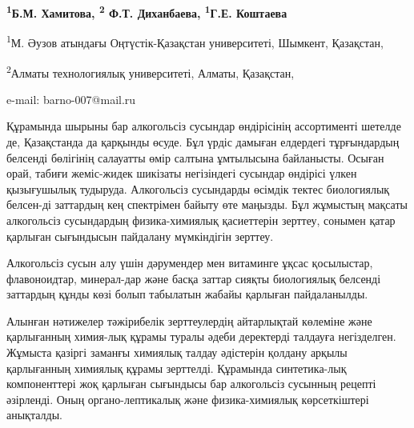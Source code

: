 \begin{center}

{\bfseries \textsuperscript{1}Б.М. Хамитова\envelope, \textsuperscript{2} Ф.Т. Диханбаева, \textsuperscript{1}Г.Е. Коштаева}

\textsuperscript{1}М. Әузов атындағы Оңтүстік-Қазақстан университеті,
Шымкент, Қазақстан,

\textsuperscript{2}Алматы технологиялық университеті, Алматы, Қазақстан,

e-mail: barno-007@mail.ru
\end{center}

Құрамында шырыны бар алкогольсіз сусындар өндірісінің ассортименті
шетелде де, Қазақстанда да қарқынды өсуде. Бұл үрдіс дамыған елдердегі
тұрғындардың белсенді бөлігінің салауатты өмір салтына ұмтылысына
байланысты. Осыған орай, табиғи жеміс-жидек шикізаты негізіндегі
сусындар өндірісі үлкен қызығушылық тудыруда. Алкогольсіз сусындарды
өсімдік тектес биологиялық белсен-ді заттардың кең спектрімен байыту өте
маңызды. Бұл жұмыстың мақсаты алкогольсіз сусындардың физика-химиялық
қасиеттерін зерттеу, сонымен қатар қарлыған сығындысын пайдалану
мүмкіндігін зерттеу.

Алкогольсіз сусын алу үшін дәрумендер мен витаминге ұқсас қосылыстар,
флавоноидтар, минерал-дар және басқа заттар сияқты биологиялық белсенді
заттардың құнды көзі болып табылатын жабайы қарлыған пайдаланылды.

Алынған нәтижелер тәжірибелік зерттеулердің айтарлықтай көлеміне және
қарлығанның химия-лық құрамы туралы әдеби деректерді талдауға
негізделген. Жұмыста қазіргі заманғы химиялық талдау әдістерін қолдану
арқылы қарлығанның химиялық құрамы зерттелді. Құрамында синтетика-лық
компоненттері жоқ қарлыған сығындысы бар алкогольсіз сусынның рецепті
әзірленді. Оның органо-лептикалық және физика-химиялық көрсеткіштері
анықталды.

